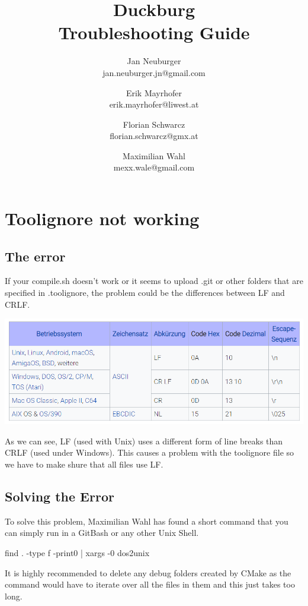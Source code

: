 \documentclass[12pt,a4paper]{article}
\author{    
    Jan Neuburger \\
    jan.neuburger.jn@gmail.com
    \and
    Erik Mayrhofer \\
    erik.mayrhofer@liwest.at
    \and
    Florian Schwarcz \\
    florian.schwarcz@gmx.at
    \and
    Maximilian Wahl \\
    mexx.wale@gmail.com
    }
\title{Duckburg\\[0.2em]Troubleshooting Guide}
\begin{document}
\maketitle
\newpage
\tableofcontents
\newpage
\section{Toolignore not working }
\subsection{The error}
If your compile.sh doesn't work or it seems to upload .git or other folders
that are specified in .toolignore, the problem could be the differences between
LF and CRLF.

\includegraphics[scale=0.75]{lf_crlf_comparison}

As we can see, LF (used with Unix) uses a different form of line breaks than
CRLF (used under Windows). This causes a problem with the toolignore file so we
have to make shure that all files use LF.
\subsection{Solving the Error}
To solve this problem, Maximilian Wahl has found a short command that you can
simply run in a GitBash or any other Unix Shell.

find . -type f -print0 | xargs -0 dos2unix

It is highly recommended to delete any debug folders created by CMake as the
command would have to iterate over all the files in them and this just takes
too long.
\end{document}
